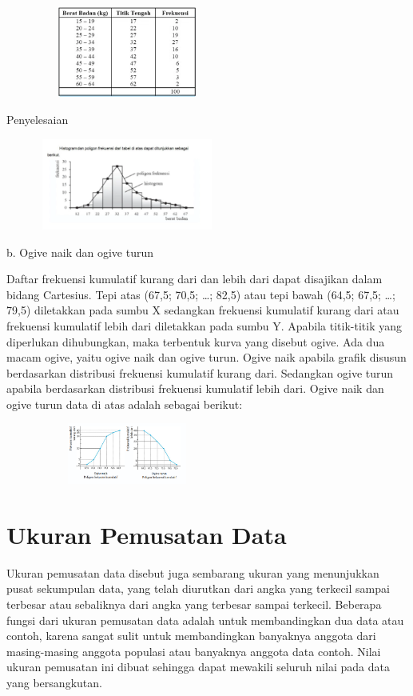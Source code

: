 \documentclass[11pt,fleqn]{book} %
\begin{document}
{\includegraphics[width = 8cm, height= 3cm]{Pictures/15reska.png}

Penyelesaian

\includegraphics[width = 8cm, height= 3cm]{Pictures/16reska.png}



b. Ogive naik dan ogive turun

Daftar frekuensi kumulatif kurang dari dan lebih dari dapat disajikan dalam bidang
Cartesius. 
Tepi atas (67,5; 70,5; …; 82,5) atau tepi bawah (64,5; 67,5; …; 79,5)
diletakkan pada sumbu X sedangkan frekuensi kumulatif kurang dari atau frekuensi
kumulatif lebih dari diletakkan pada sumbu Y.
Apabila titik-titik yang diperlukan
dihubungkan, maka terbentuk kurva yang disebut ogive. Ada dua macam ogive,
yaitu ogive naik dan ogive turun. Ogive naik apabila grafik disusun berdasarkan
distribusi frekuensi kumulatif kurang dari. Sedangkan ogive turun apabila berdasarkan
distribusi frekuensi kumulatif lebih dari.
Ogive naik dan ogive turun data di atas adalah
sebagai berikut:


\includegraphics[width = 8cm, height= 2cm]{Pictures/14reska.png}


\section{Ukuran Pemusatan Data}

Ukuran pemusatan data disebut juga sembarang ukuran yang menunjukkan pusat sekumpulan data, yang telah diurutkan dari angka yang terkecil sampai terbesar atau sebaliknya dari angka yang terbesar sampai terkecil. Beberapa fungsi dari ukuran pemusatan data adalah untuk membandingkan dua data atau contoh, karena sangat sulit untuk membandingkan banyaknya anggota dari masing-masing anggota populasi atau banyaknya anggota data contoh. Nilai ukuran pemusatan ini dibuat sehingga dapat mewakili seluruh nilai pada data yang bersangkutan.

}
\end{document}

